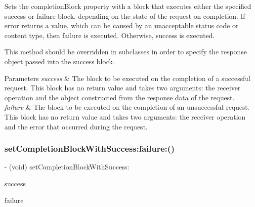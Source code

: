 Sets the {\ttfamily completion\+Block} property with a block that executes either the specified success or failure block, depending on the state of the request on completion. If {\ttfamily error} returns a value, which can be caused by an unacceptable status code or content type, then {\ttfamily failure} is executed. Otherwise, {\ttfamily success} is executed.

This method should be overridden in subclasses in order to specify the response object passed into the success block.


\begin{DoxyParams}{Parameters}
{\em success} & The block to be executed on the completion of a successful request. This block has no return value and takes two arguments\+: the receiver operation and the object constructed from the response data of the request. \\
\hline
{\em failure} & The block to be executed on the completion of an unsuccessful request. This block has no return value and takes two arguments\+: the receiver operation and the error that occurred during the request. \\
\hline
\end{DoxyParams}
\mbox{\label{interface_a_f_h_t_t_p_request_operation_a3b816391726dade9cfc9cbc11cc352d6}} 
\subsubsection{\texorpdfstring{set\+Completion\+Block\+With\+Success\+:failure\+:()}{setCompletionBlockWithSuccess:failure:()}\hspace{0.1cm}{\footnotesize\ttfamily [2/3]}}
{\footnotesize\ttfamily -\/ (void) set\+Completion\+Block\+With\+Success\+: \begin{DoxyParamCaption}\item[{(nullable void($^\wedge$)(\mbox{\hyperlink{interface_a_f_h_t_t_p_request_operation}{A\+F\+H\+T\+T\+P\+Request\+Operation}} $\ast$operation, id \mbox{\hyperlink{interface_a_f_h_t_t_p_request_operation_a7418f7784dcaf21623ce588fb27734c3}{response\+Object}}))}]{success }\item[{failure:(nullable void($^\wedge$)(\mbox{\hyperlink{interface_a_f_h_t_t_p_request_operation}{A\+F\+H\+T\+T\+P\+Request\+Operation}} $\ast$operation, N\+S\+Error $\ast$\mbox{\hyperlink{interface_a_f_u_r_l_connection_operation_a51f90be47e7f7577b979aae1aa597070}{error}}))}]{failure }\end{DoxyParamCaption}}

